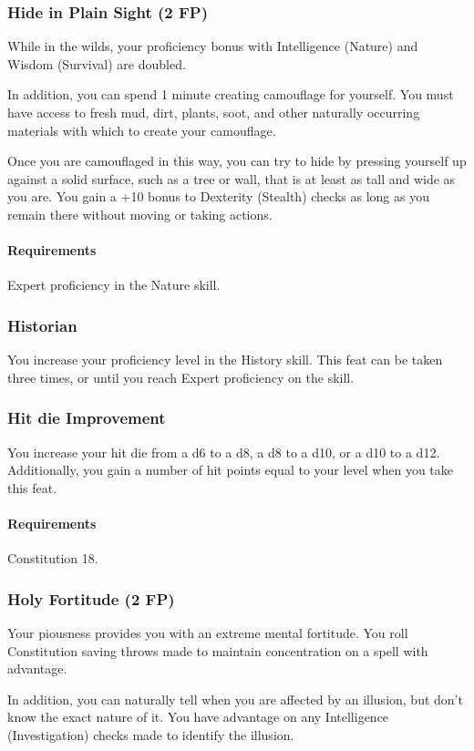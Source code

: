 \subsubsection{Hide in Plain Sight (2 FP)} \label{feat::hideinplainsight}
    While in the wilds, your proficiency bonus with Intelligence (Nature) and Wisdom (Survival) are doubled.

    In addition, you can spend 1 minute creating camouflage for yourself.
    You must have access to fresh mud, dirt, plants, soot, and other naturally occurring materials with which to create your camouflage.

    Once you are camouflaged in this way, you can try to hide by pressing yourself up against a solid surface, such as a tree or wall, that is at least as tall and wide as you are.
    You gain a +10 bonus to Dexterity (Stealth) checks as long as you remain there without moving or taking actions.
    \paragraph{Requirements} Expert proficiency in the Nature skill.
\subsubsection{Historian} \label{feat::historian}
    You increase your proficiency level in the History skill.
    This feat can be taken three times, or until you reach Expert proficiency on the skill.
\subsubsection{Hit die Improvement} \label{feat::hitdieimprovement}
    You increase your hit die from a d6 to a d8, a d8 to a d10, or a d10 to a d12.
    Additionally, you gain a number of hit points equal to your level when you take this feat.
    \paragraph{Requirements} Constitution 18.
\subsubsection{Holy Fortitude (2 FP)} \label{feat::holyfortitude}
    Your piousness provides you with an extreme mental fortitude.
    You roll Constitution saving throws made to maintain concentration on a spell with advantage.

    In addition, you can naturally tell when you are affected by an illusion, but don't know the exact nature of it.
    You have advantage on any Intelligence (Investigation) checks made to identify the illusion.
